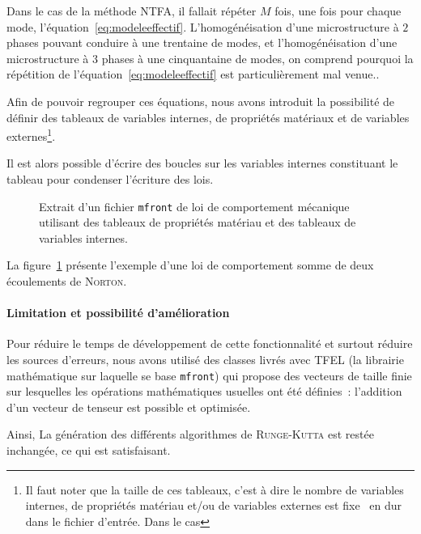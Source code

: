 \documentclass[rectoverso,pleiades,pstricks,leqno,anti]{texmf/note_technique_2010}
\newcommand{\mfront}{\texttt{mfront}}
\newcommand{\code}[1]{
  \psframebox[linecolor=ceaorange,shadow=true,blur=true]{
    \begin{minipage}[htbp]{1.0\linewidth}
      \ttfamily\scriptsize #1
    \end{minipage}
  }
}
\begin{document}
{  Dans le cas de la méthode NTFA, il fallait répéter \(M\) fois, une
  fois pour chaque mode, l'équation~\eqref{eq:modeleeffectif}.
  L'homogénéisation d'une microstructure à \(2\) phases pouvant conduire
  à une trentaine de modes, et l'homogénéisation d'une microstructure à
  \(3\) phases à une cinquantaine de modes, on comprend pourquoi la
  répétition de l'équation~\eqref{eq:modeleeffectif} est
  particulièrement mal venue.}.

Afin de pouvoir regrouper ces équations, nous avons introduit la
possibilité de définir des tableaux de variables internes, de propriétés
matériaux et de variables externes\footnote{Il faut noter que la taille
de ces tableaux, c'est à dire le nombre de variables internes, de
propriétés matériau et/ou de variables externes est fixe \og~en
dur~\fg{} dans le fichier d'entrée. Dans le cas}.

Il est alors possible d'écrire des boucles sur les variables internes
constituant le tableau pour condenser l'écriture des lois.

\begin{figure}
  \code{\scriptsize  }
  \caption{Extrait d'un fichier \mfront{} de loi de comportement mécanique utilisant des
    tableaux de propriétés matériau et des tableaux de variables
    internes.}
  \label{2norton-rk}
\end{figure}

La figure~\ref{2norton-rk} présente l'exemple d'une loi de comportement
somme de deux écoulements de \textsc{Norton}.

\paragraph{Limitation et possibilité d'amélioration} Pour réduire le
temps de développement de cette fonctionnalité et surtout réduire les
sources d'erreurs, nous avons utilisé des classes livrés avec TFEL (la
librairie mathématique sur laquelle se base \mfront{}) qui propose des
vecteurs de taille finie sur lesquelles les opérations mathématiques
usuelles ont été définies~: l'addition d'un vecteur de tenseur est
possible et optimisée.

Ainsi, La génération des différents algorithmes de \textsc{Runge-Kutta}
est restée inchangée, ce qui est satisfaisant. 
\end{document}
